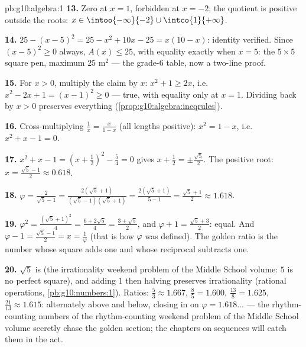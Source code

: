 \begin{solution}{pb:g10:algebra:1}
\textbf{13.} Zero at $x = 1$, forbidden at $x = -2$; the
quotient is positive outside the roots:
$x \in \intoo{-\infty}{-2} \cup \intco{1}{+\infty}$.

\textbf{14.} $25 - (x - 5)^2 = 25 - x^2 + 10x - 25 =
x(10 - x)$: identity verified. Since $(x-5)^2 \geq 0$ always,
$A(x) \leq 25$, with equality exactly when $x = 5$: the
$5 \times 5$ square pen, maximum $25$ m$^2$ --- the grade-6
table, now a two-line proof.

\textbf{15.} For $x > 0$, multiply the claim by $x$:
$x^2 + 1 \geq 2x$, i.e.\ $x^2 - 2x + 1 = (x - 1)^2 \geq 0$ ---
true, with equality only at $x = 1$. Dividing back by $x > 0$
preserves everything (\cref{prop:g10:algebra:ineqrules}).

\textbf{16.} Cross-multiplying $\frac1x = \frac{x}{1 - x}$
(all lengths positive): $x^2 = 1 - x$, i.e.\
$x^2 + x - 1 = 0$.

\textbf{17.} $x^2 + x - 1 = \left(x + \frac12\right)^2 -
\frac54 = 0$ gives $x + \frac12 = \pm\frac{\sqrt5}{2}$. The
positive root: $x = \frac{\sqrt5 - 1}{2} \approx 0.618$.

\textbf{18.} $\varphi = \frac{2}{\sqrt5 - 1} =
\frac{2(\sqrt5 + 1)}{(\sqrt5 - 1)(\sqrt5 + 1)}
= \frac{2(\sqrt5 + 1)}{5 - 1} = \frac{\sqrt5 + 1}{2}
\approx 1.618$.

\textbf{19.} $\varphi^2 = \frac{(\sqrt5 + 1)^2}{4} =
\frac{6 + 2\sqrt5}{4} = \frac{3 + \sqrt5}{2}$, and
$\varphi + 1 = \frac{\sqrt5 + 3}{2}$: equal. And
$\varphi - 1 = \frac{\sqrt5 - 1}{2} = x = \frac1\varphi$ (that
is how $\varphi$ was defined). The golden ratio is the number
whose square adds one and whose reciprocal subtracts one.

\textbf{20.} $\sqrt5$ is  (the irrationality weekend problem of the Middle School volume: $5$
is no perfect square), and adding $1$ then halving preserves
irrationality (rational operations, \cref{pb:g10:numbers:1}).
Ratios: $\frac53 \approx 1.667$, $\frac85 = 1.600$,
$\frac{13}{8} = 1.625$, $\frac{21}{13} \approx 1.615$:
alternately above and below, closing in on
$\varphi = 1.618\ldots$ --- the rhythm-counting numbers of
the rhythm-counting weekend problem of the Middle School volume secretly chase the golden section; the
chapters on sequences will catch them in the act.
\end{solution}
